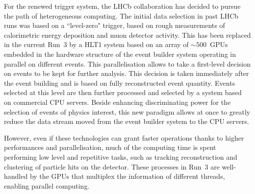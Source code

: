 For the renewed trigger system, the LHCb collaboration has decided to pursue the path of heterogeneous computing. The initial data selection in past LHCb runs was based on a ``level-zero" trigger, based on rough measurements of calorimetric energy deposition and muon detector activity. This has been replaced in the current Run~3 by a HLT1 system based on an array of $\sim 500$~GPUs embedded in the hardware structure of the event builder system operating in parallel on different events. This parallelisation allows to take a first-level decision on events to be kept for further analysis. This decision is taken immediately after the event building and is based on fully reconstructed event quantity. Events selected at this level are then further processed and selected by a system based on commercial CPU servers. Beside enhancing discriminating power for the selection of events of physics interest, this new paradigm allows at once to greatly reduce the data stream moved from the event builder system to the CPU servers. 




However, even if these technologies can grant faster operations thanks to higher performances and parallelisation, much of the computing time is spent performing low level and repetitive tasks, such as tracking reconstruction and clustering of particle hits on the detector. These processes in Run~3 are well-handled by the GPUs that multiplex the information of different threads, enabling parallel computing.

